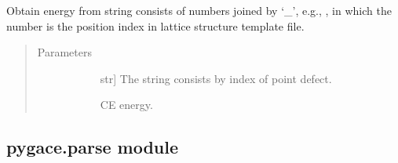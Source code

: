 \documentclass[letterpaper,10pt,english]{sphinxmanual}
\begin{document}
\begin{fulllineitems}
\begin{fulllineitems}
\begin{quote}
\begin{description}
\end{description}\end{quote}

\end{fulllineitems}


\begin{fulllineitems}
\label{\detokenize{pygace:pygace.general_gace.Runner.str2energy}}
Obtain energy from string consists of numbers joined by ‘\_’, e.g.,
, in which the number is the position index in lattice
structure template file.
\begin{quote}\begin{description}
\item[{Parameters}] \leavevmode\begin{description}
\item[{}] \leavevmode{[}str{]}
The string consists by index of point defect.

\item[{}] \leavevmode
\item[{}] \leavevmode
\item[{}] \leavevmode
CE energy.

\end{description}

\end{description}\end{quote}

\end{fulllineitems}


\end{fulllineitems}



\subsection{pygace.parse module}
\label{\detokenize{pygace:module-pygace.parse}}\label{\detokenize{pygace:pygace-parse-module}}
\end{document}
